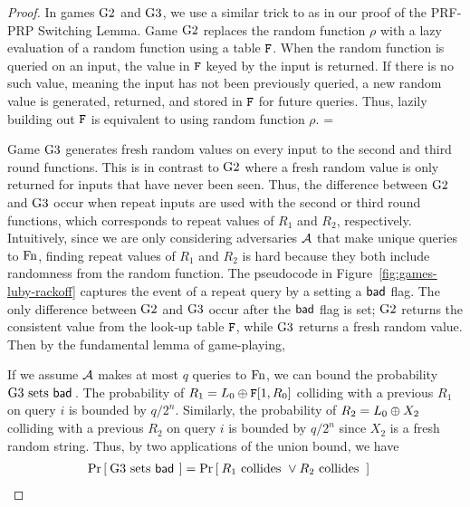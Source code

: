 \begin{proof}
In games ${{\textnormal G}}2$ and ${{\textnormal G}}3$, we use a similar trick to as in our proof of the PRF-PRP Switching Lemma.
Game ${{\textnormal G}}2$ replaces the random function $\rho$ with a lazy evaluation of a random function using a table $\mathtt{F}$.
When the random function is queried on an input, the value in $\mathtt{F}$ keyed by the input is returned.
If there is no such value, meaning the input has not been previously queried, a new random value is generated, returned, and stored in $\mathtt{F}$ for future queries.
Thus, lazily building out $\mathtt{F}$ is equivalent to using random function $\rho$.
\bnm
{} = 
\enm

Game ${{\textnormal G}}3$ generates fresh random values on every input to the second and third round functions.
This is in contrast to ${{\textnormal G}}2$ where a fresh random value is only returned for inputs that have never been seen.
Thus, the difference between ${{\textnormal G}}2$ and ${{\textnormal G}}3$ occur when repeat inputs are used with the second or third round functions, which corresponds to repeat values of $R_1$ and $R_2$, respectively.
Intuitively, since we are only considering adversaries ${\mathcal A}$ that make unique queries to $\textnormal{Fn}$, finding repeat values of $R_1$ and $R_2$ is hard because they both include randomness from the random function.
The pseudocode in Figure~\ref{fig:games-luby-rackoff} captures the event of a repeat query by a setting a $\mathsf{bad}$ flag.
The only difference between ${{\textnormal G}}2$ and ${{\textnormal G}}3$ occur after the $\mathsf{bad}$ flag is set; ${{\textnormal G}}2$ returns the consistent value from the look-up table $\mathtt{F}$, while ${{\textnormal G}}3$ returns a fresh random value.
Then by the fundamental lemma of game-playing,
\bnm
{} \le {}
\enm

If we assume ${\mathcal A}$ makes at most $q$ queries to $\textnormal{Fn}$, we can bound the probability ${{\textnormal G}}3\mbox{~\textup{sets} $\mathsf{bad}$}\,$.
The probability of $R_1 = L_0 {\:\oplus\:} \mathtt{F}[1,R_0]$ colliding with a previous $R_1$ on query $i$ is bounded by $q/2^n$.
Similarly, the probability of $R_2 = L_0 {\:\oplus\:} X_2$ colliding with a previous $R_2$ on query $i$ is bounded by $q/2^n$ since $X_2$ is a fresh random string.
Thus, by two applications of the union bound, we have
\begin{align*}
  \Pr\left[\: {{\textnormal G}}3 \mbox{~\textup{sets} $\mathsf{bad}$}\, \:\right] &= \Pr\left[\: R_1 \text{ collides } \vee R_2 \text{ collides } \:\right]
\end{align*}


\end{proof}

